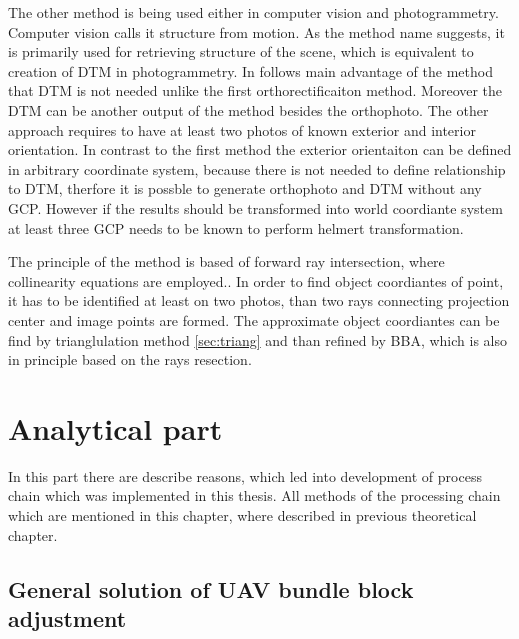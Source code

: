\documentclass[a4paper,12pt]{report}
\begin{document}
The other method is being used either in computer vision and photogrammetry.
Computer vision calls it structure from motion. As the method name suggests, it is primarily used for retrieving
structure of the scene, which is equivalent to creation of DTM in photogrammetry. In follows main advantage 
of the method that DTM is not needed unlike the first orthorectificaiton method. Moreover 
the DTM can be another output of the method besides the orthophoto.  The other approach requires to have at least
two photos of known exterior and interior orientation. In contrast to the first method the exterior orientaiton
can be defined in arbitrary coordinate system, because there is not needed to define relationship to DTM, 
therfore it is possble to generate orthophoto and DTM without any GCP. However 
if the results should be transformed into world coordiante system at least three GCP needs to be known
to perform helmert transformation. 


The principle of the method is based of forward ray intersection, where collinearity equations are employed..
In order to find object coordiantes
of point, it has to be identified at least on two photos, than two rays connecting projection 
center and image points are formed. The approximate object coordiantes can be find by trianglulation 
method \ref{sec:triang} and than refined by BBA, which is also in principle based on the rays 
resection.
 

\chapter{Analytical part}

In this part there are describe reasons, which led into development of process chain which was implemented in 
this thesis. All methods of the processing chain which are mentioned in this chapter, where described in 
previous theoretical chapter.

\section{General solution of UAV bundle block adjustment}
\end{document}
